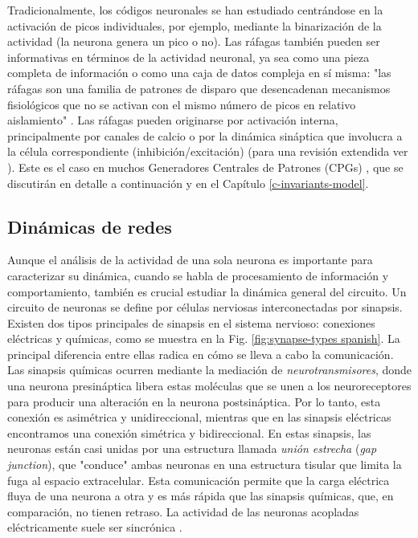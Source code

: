 Tradicionalmente, los códigos neuronales se han estudiado centrándose en la activación de picos individuales, por ejemplo, mediante la binarización de la actividad (la neurona genera un pico o no). Las ráfagas también pueden ser informativas en términos de la actividad neuronal, ya sea como una pieza completa de información o como una caja de datos compleja en sí misma: "las ráfagas son una familia de patrones de disparo que desencadenan mecanismos fisiológicos que no se activan con el mismo número de picos en relativo aislamiento" \parencite{friedenberger_silences_2023}. Las ráfagas pueden originarse por activación interna, principalmente por canales de calcio o por la dinámica sináptica que involucra a la célula correspondiente (inhibición/excitación) (para una revisión extendida ver \parencite{friedenberger_silences_2023}). Este es el caso en muchos Generadores Centrales de Patrones (CPGs) \parencite{Katz,steuer_central_2018}, que se discutirán en detalle a continuación y en el Capítulo \ref{c-invariants-model}.

\subsection{Dinámicas de redes}

Aunque el análisis de la actividad de una sola neurona es importante para caracterizar su dinámica, cuando se habla de procesamiento de información y comportamiento, también es crucial estudiar la dinámica general del circuito. Un circuito de neuronas se define por células nerviosas interconectadas por sinapsis. Existen dos tipos principales de sinapsis en el sistema nervioso: conexiones eléctricas y químicas, como se muestra en la Fig. \ref{fig:synapse-types spanish}. La principal diferencia entre ellas radica en cómo se lleva a cabo la comunicación. Las sinapsis químicas ocurren mediante la mediación de \textit{neurotransmisores}, donde una neurona presináptica libera estas moléculas que se unen a los neuroreceptores para producir una alteración en la neurona postsináptica. Por lo tanto, esta conexión es asimétrica y unidireccional, mientras que en las sinapsis eléctricas encontramos una conexión simétrica y bidireccional. En estas sinapsis, las neuronas están casi unidas por una estructura llamada \textit{unión estrecha} (\textit{gap junction}), que "conduce" ambas neuronas en una estructura tisular que limita la fuga al espacio extracelular. Esta comunicación permite que la carga eléctrica fluya de una neurona a otra y es más rápida que las sinapsis químicas, que, en comparación, no tienen retraso. La actividad de las neuronas acopladas eléctricamente suele ser sincrónica \parencite{levitan_neuron_2002}.

